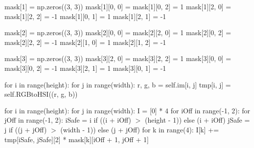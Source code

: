 \documentclass[final,a4paper,openany,12pt]{mwbk}
\begin{document}
mask[1] = np.zeros((3, 3)) \newline
\indent mask[1][0, 0] = mask[1][0, 2] = 1 \newline
\indent mask[1][2, 0] = mask[1][2, 2] = -1 \newline
\indent mask[1][0, 1] = 1 \newline
\indent mask[1][2, 1] = -1 \newline

mask[2] = np.zeros((3, 3)) \newline
\indent mask[2][0, 0] = mask[2][2, 0] = 1 \newline
\indent mask[2][0, 2] = mask[2][2, 2] = -1 \newline
\indent mask[2][1, 0] = 1 \newline
\indent mask[2][1, 2] = -1 \newline

mask[3] = np.zeros((3, 3)) \newline
\indent mask[3][2, 0] = mask[3][2, 2] = 1 \newline
\indent mask[3][0, 0] = mask[3][0, 2] = -1 \newline
\indent mask[3][2, 1] = 1 \newline
\indent mask[3][0, 1] = -1 \newline


for i in range(height): \newline
\indent for j in range(width): \newline
\indent r, g, b = self.im[i, j] \newline
\indent tmp[i, j] = self.RGBtoHSI((r, g, b)) \newline

for i in range(height): \newline
\indent for j in range(width): \newline
\indent \indent \indent I = [0] * 4 \newline
\indent \indent \indent for iOff in range(-1, 2): \newline
\indent \indent \indent for jOff in range(-1, 2): \newline
\indent \indent \indent iSafe = i if ((i + iOff) $>$ (height - 1)) else (i + iOff) \newline
\indent \indent \indent jSafe = j if ((j + jOff) $>$ (width - 1)) else (j + jOff) \newline
\indent \indent \indent for k in range(4): \newline
\indent \indent \indent I[k] += tmp[iSafe, jSafe][2] * mask[k][iOff + 1, jOff + 1] \newline
\end{document}
